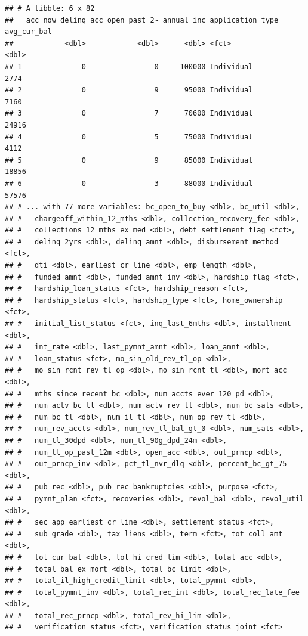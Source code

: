 \documentclass[]{article}
\begin{document}
\begin{verbatim}
## # A tibble: 6 x 82
##   acc_now_delinq acc_open_past_2~ annual_inc application_type avg_cur_bal
##            <dbl>            <dbl>      <dbl> <fct>                  <dbl>
## 1              0                0     100000 Individual              2774
## 2              0                9      95000 Individual              7160
## 3              0                7      70600 Individual             24916
## 4              0                5      75000 Individual              4112
## 5              0                9      85000 Individual             18856
## 6              0                3      88000 Individual             57576
## # ... with 77 more variables: bc_open_to_buy <dbl>, bc_util <dbl>,
## #   chargeoff_within_12_mths <dbl>, collection_recovery_fee <dbl>,
## #   collections_12_mths_ex_med <dbl>, debt_settlement_flag <fct>,
## #   delinq_2yrs <dbl>, delinq_amnt <dbl>, disbursement_method <fct>,
## #   dti <dbl>, earliest_cr_line <dbl>, emp_length <dbl>,
## #   funded_amnt <dbl>, funded_amnt_inv <dbl>, hardship_flag <fct>,
## #   hardship_loan_status <fct>, hardship_reason <fct>,
## #   hardship_status <fct>, hardship_type <fct>, home_ownership <fct>,
## #   initial_list_status <fct>, inq_last_6mths <dbl>, installment <dbl>,
## #   int_rate <dbl>, last_pymnt_amnt <dbl>, loan_amnt <dbl>,
## #   loan_status <fct>, mo_sin_old_rev_tl_op <dbl>,
## #   mo_sin_rcnt_rev_tl_op <dbl>, mo_sin_rcnt_tl <dbl>, mort_acc <dbl>,
## #   mths_since_recent_bc <dbl>, num_accts_ever_120_pd <dbl>,
## #   num_actv_bc_tl <dbl>, num_actv_rev_tl <dbl>, num_bc_sats <dbl>,
## #   num_bc_tl <dbl>, num_il_tl <dbl>, num_op_rev_tl <dbl>,
## #   num_rev_accts <dbl>, num_rev_tl_bal_gt_0 <dbl>, num_sats <dbl>,
## #   num_tl_30dpd <dbl>, num_tl_90g_dpd_24m <dbl>,
## #   num_tl_op_past_12m <dbl>, open_acc <dbl>, out_prncp <dbl>,
## #   out_prncp_inv <dbl>, pct_tl_nvr_dlq <dbl>, percent_bc_gt_75 <dbl>,
## #   pub_rec <dbl>, pub_rec_bankruptcies <dbl>, purpose <fct>,
## #   pymnt_plan <fct>, recoveries <dbl>, revol_bal <dbl>, revol_util <dbl>,
## #   sec_app_earliest_cr_line <dbl>, settlement_status <fct>,
## #   sub_grade <dbl>, tax_liens <dbl>, term <fct>, tot_coll_amt <dbl>,
## #   tot_cur_bal <dbl>, tot_hi_cred_lim <dbl>, total_acc <dbl>,
## #   total_bal_ex_mort <dbl>, total_bc_limit <dbl>,
## #   total_il_high_credit_limit <dbl>, total_pymnt <dbl>,
## #   total_pymnt_inv <dbl>, total_rec_int <dbl>, total_rec_late_fee <dbl>,
## #   total_rec_prncp <dbl>, total_rev_hi_lim <dbl>,
## #   verification_status <fct>, verification_status_joint <fct>
\end{verbatim}
\end{document}
